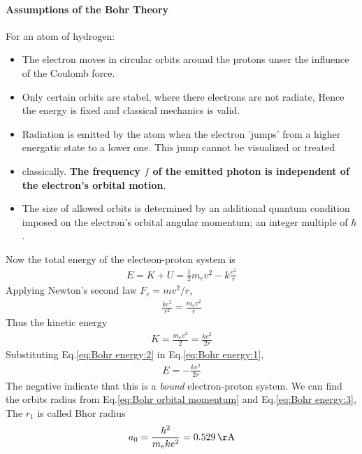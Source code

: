         \paragraph{Assumptions of the Bohr Theory} For an atom of hydrogen:
        \begin{itemize}
            \item The electron moves in circular orbits around the protons unser the influence of the Coulomb force.
            \item Only certain orbits are stabel, where there electrons are not radiate, Hence the energy is fixed and classical mechanics is valid.
            \item Radiation is emitted by the atom when the electron 'jumps' from a higher energatic state to a lower one. This jump cannot be visualized or treated
            \item classically. \textbf{The frequency $f$ of the emitted photon is independent of the electron's orbital motion}. 
            \item The size of allowed orbits is determined by an additional quantum condition imposed on the electron's orbital angular momentum; an integer multiple of 
            $\hbar$. 
        \end{itemize}

        Now the total energy of the electeon-proton system is 
        \begin{align}
            \label{eq:Bohr energy:1}
            E = K + U = \frac{1}{2} m_e v^2 - k \frac{e^2}{r}
        \end{align}
        Applying Newton’s second law $F_r = mv^2/r$,
        \begin{align*}
            \frac{k e^2}{r^2} = \frac{m_e v^2}{r}
        \end{align*}
        Thus the kinetic energy 
        \begin{align}
            \label{eq:Bohr energy:2}
            K = \frac{m_e v^2}{2} = \frac{k e^2}{2r}
        \end{align}
        Substituting Eq.\eqref{eq:Bohr energy:2} in Eq.\eqref{eq:Bohr energy:1},
        \begin{align}
            \label{eq:Bohr energy:3}
            E = - \frac{k e^2}{2r}
        \end{align}
        The negative indicate that this is a \textit{bound} electron-proton system.
        We can find the orbits radius from Eq.\eqref{eq:Bohr orbital momentum} and Eq.\eqref{eq:Bohr energy:3},
         The $r_1$ is called Bhor radius 
        \begin{align*}
            a_0 = \frac{\hbar^2}{m_e k e^2} = \SI{0.529}{\AA}
        \end{align*}

